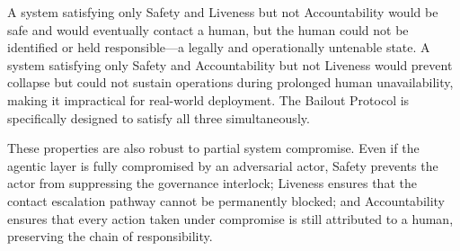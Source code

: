 A system satisfying only Safety and Liveness but not Accountability would be safe and would eventually contact a human, but the human could not be identified or held responsible---a legally and operationally untenable state. A system satisfying only Safety and Accountability but not Liveness would prevent collapse but could not sustain operations during prolonged human unavailability, making it impractical for real-world deployment. The Bailout Protocol is specifically designed to satisfy all three simultaneously.

These properties are also robust to partial system compromise. Even if the agentic layer is fully compromised by an adversarial actor, Safety prevents the actor from suppressing the governance interlock; Liveness ensures that the contact escalation pathway cannot be permanently blocked; and Accountability ensures that every action taken under compromise is still attributed to a human, preserving the chain of responsibility.

